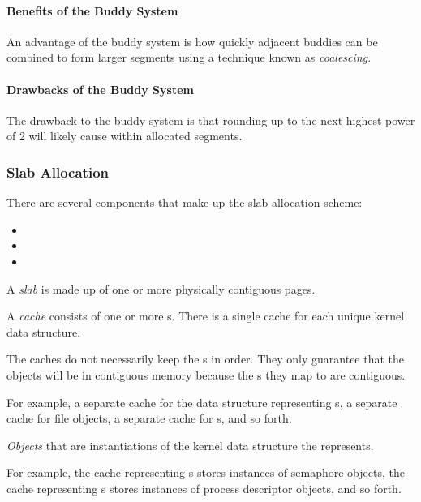 \paragraph{Benefits of the Buddy System}\label{par:Buddy_System_Benefits}
An advantage of the buddy system is how quickly adjacent buddies can be combined to form larger segments using a technique known as \emph{coalescing}.

\paragraph{Drawbacks of the Buddy System}\label{par:Buddy_System_Drawbacks}
The drawback to the buddy system is that rounding up to the next highest power of 2 will likely cause  within allocated segments.

\subsubsection{Slab Allocation}\label{subsubsec:Slab_Allocation}
There are several components that make up the slab allocation scheme:
\begin{itemize}[noitemsep]
\item {}
\item {}
\item {}
\end{itemize}

\begin{definition}[Slab]\label{def:Slab}
  A \emph{slab} is made up of one or more physically contiguous pages.
\end{definition}

\begin{definition}[Cache]\label{def:Slab_Cache}
  A \emph{cache} consists of one or more s.
  There is a single cache for each unique kernel data structure.

  The caches do not necessarily keep the s in order.
  They only guarantee that the objects will be in contiguous memory because the s they map to are contiguous.

  For example, a separate cache for the data structure representing s, a separate cache for file objects, a separate cache for s, and so forth.
\end{definition}

\begin{definition}[Object]\label{def:Slab_Object}
  \emph{Objects} that are instantiations of the kernel data structure the  represents.

  For example, the cache representing s stores instances of semaphore objects, the cache representing s stores instances of process descriptor objects, and so forth.
\end{definition}


